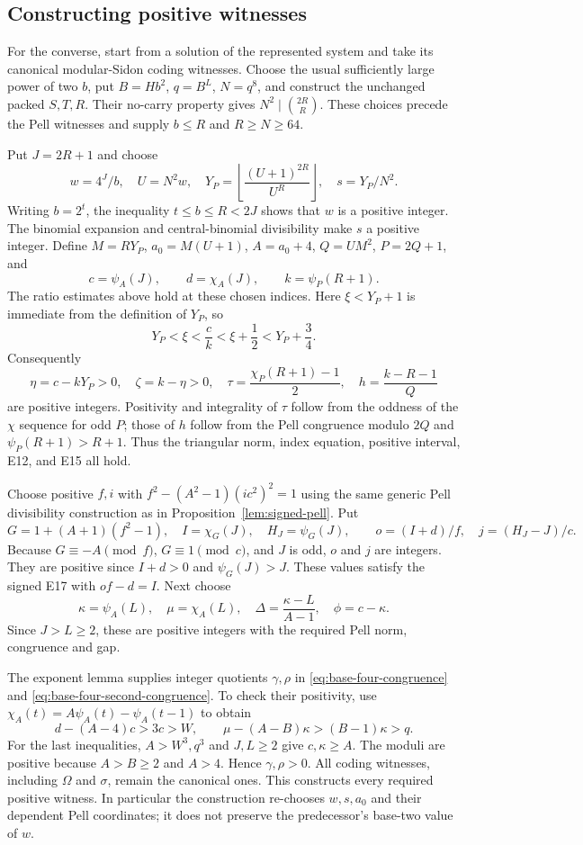\subsection{Constructing positive witnesses}

For the converse, start from a solution of the represented system
and take its canonical modular-Sidon coding witnesses. Choose the
usual sufficiently large power of two $b$, put $B=Hb^2$,
$q=B^L$, $N=q^8$, and construct the unchanged packed $S,T,R$.
Their no-carry property gives $N^2\mid\binom{2R}{R}$.
These choices precede the Pell witnesses and supply $b\le R$
and $R\ge N\ge64$.

Put $J=2R+1$ and choose
\[
 w=4^J/b,\quad U=N^2w,\quad
 Y_P=\left\lfloor\frac{(U+1)^{2R}}{U^R}\right\rfloor,
 \quad s=Y_P/N^2.
\]
Writing $b=2^t$, the inequality $t\le b\le R<2J$ shows that
$w$ is a positive integer. The binomial expansion and central-binomial
divisibility make $s$ a positive integer. Define
$M=RY_P$, $a_0=M(U+1)$, $A=a_0+4$, $Q=UM^2$, $P=2Q+1$, and
\[
 c=\psi_A(J),\qquad d=\chi_A(J),\qquad k=\psi_P(R+1).
\]
The ratio estimates above hold at these chosen indices.
Here $\xi<Y_P+1$ is immediate from the definition of $Y_P$, so
\[
 Y_P<\xi<\frac ck<\xi+\frac12<Y_P+\frac34.
\]
Consequently
\[
 \eta=c-kY_P>0,\quad \zeta=k-\eta>0,\quad
 \tau=\frac{\chi_P(R+1)-1}{2},\quad
 h=\frac{k-R-1}{Q}
\]
are positive integers. Positivity and integrality of $\tau$ follow
from the oddness of the $\chi$ sequence for odd $P$; those of $h$
follow from the Pell congruence modulo $2Q$ and
$\psi_P(R+1)>R+1$. Thus the triangular norm, index equation,
positive interval, E12, and E15 all hold.

Choose positive $f,i$ with
$f^2-(A^2-1)(ic^2)^2=1$ using the same generic Pell divisibility
construction as in Proposition~\ref{lem:signed-pell}. Put
\[
 G=1+(A+1)(f^2-1),\quad I=\chi_G(J),\quad H_J=\psi_G(J),
 \qquad o=(I+d)/f,\quad j=(H_J-J)/c.
\]
Because $G\equiv-A\pmod f$, $G\equiv1\pmod c$, and $J$ is odd,
$o$ and $j$ are integers. They are positive since $I+d>0$ and
$\psi_G(J)>J$. These values satisfy the signed E17 with $of-d=I$.
Next choose
\[
 \kappa=\psi_A(L),\quad \mu=\chi_A(L),\quad
 \Delta=\frac{\kappa-L}{A-1},\quad \phi=c-\kappa.
\]
Since $J>L\ge2$, these are positive integers with the required
Pell norm, congruence and gap.

The exponent lemma supplies integer quotients $\gamma,\rho$ in
\eqref{eq:base-four-congruence} and
\eqref{eq:base-four-second-congruence}. To check their positivity,
use $\chi_A(t)=A\psi_A(t)-\psi_A(t-1)$ to obtain
\[
 d-(A-4)c>3c>W,
 \qquad \mu-(A-B)\kappa>(B-1)\kappa>q.
\]
For the last inequalities, $A>W^3,q^3$ and $J,L\ge2$ give
$c,\kappa\ge A$. The moduli are positive because $A>B\ge2$
and $A>4$. Hence $\gamma,\rho>0$.
All coding witnesses, including $\Omega$ and $\sigma$, remain
the canonical ones. This constructs every required positive witness.
In particular the construction re-chooses $w,s,a_0$ and their
dependent Pell coordinates; it does not preserve the predecessor's
base-two value of $w$.

